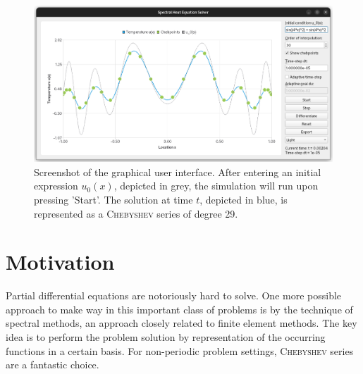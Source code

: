 \documentclass[12pt, a4paper]{article}
\newcommand{\chebyshev}{\textsc{Chebyshev}\xspace}
\begin{document}
  \begin{figure}[H]
    \centering
    \includegraphics[width=\linewidth]{figures/screenshot.png}
    \caption{Screenshot of the graphical user interface. After entering an initial expression $u_0(x)$, depicted in grey, the simulation will run upon pressing 'Start'. The solution at time $t$, depicted in blue, is represented as a \chebyshev series of degree 29.}
  \end{figure}

  \pagebreak
  \pagestyle{normal}


  \section{Motivation}
  Partial differential equations are notoriously hard to solve. One more possible approach to make way in this important class of problems is by the technique of spectral methods, an approach closely related to finite element methods.
  The key idea is to perform the problem solution by representation of the occurring functions in a certain basis.
  For non-periodic problem settings, \chebyshev series are a fantastic choice.
\end{document}
